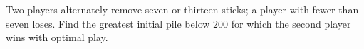 Two players alternately remove seven or thirteen sticks; a player with fewer than seven loses. Find the greatest initial pile below $200$ for which the second player wins with optimal play.
